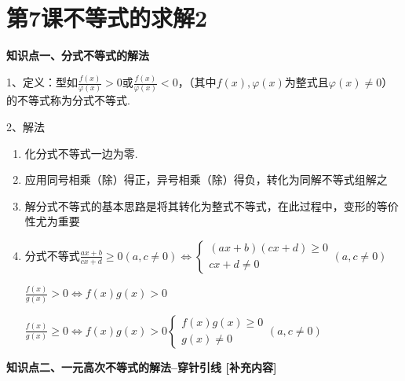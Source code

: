 \documentclass[10pt,a4paper]{ctexbook}
\begin{document}
\clearpage
\section{第7课\quad 不等式的求解2}

\begin{formal}
    {\large \textbf{知识点一、分式不等式的解法}}
\end{formal}
1、定义：型如$\displaystyle \frac{f(x)}{\varphi(x)}>0$或$\displaystyle \frac{f(x)}{\varphi(x)}<0$，（其中$f(x),\varphi(x)$为整式且$\varphi(x)\ne 0$）的不等式称为分式不等式.\par
2、解法\par
\begin{enumerate}
    \item 化分式不等式一边为零.
    \item 应用同号相乘（除）得正，异号相乘（除）得负，转化为同解不等式组解之
    \item 解分式不等式的基本思路是将其转化为整式不等式，在此过程中，变形的等价性尤为重要
    \item 分式不等式$\displaystyle \frac{ax+b}{cx+d}\ge 0(a,c \ne 0) \Leftrightarrow
    \left\{
        \begin{aligned}
        (ax+b)(cx+d)\ge 0 \\
        cx+d \ne 0 
        \end{aligned}
        \right. 
        (a,c \ne 0) 
    $\par
    $\displaystyle \frac{f(x)}{g(x)}> 0 \Leftrightarrow f(x)g(x)>0 $\par
    $\displaystyle \frac{f(x)}{g(x)}\ge 0 \Leftrightarrow f(x)g(x)>0
    \left\{
        \begin{aligned}
            f(x)g(x)\ge 0 \\
            g(x) \ne 0 
        \end{aligned}
        (a,c \ne 0)
        \right.  
    $\par

\end{enumerate}
\begin{formal}
    {\large \textbf{知识点二、一元高次不等式的解法--穿针引线 [补充内容]}}
\end{formal}
\end{document}
